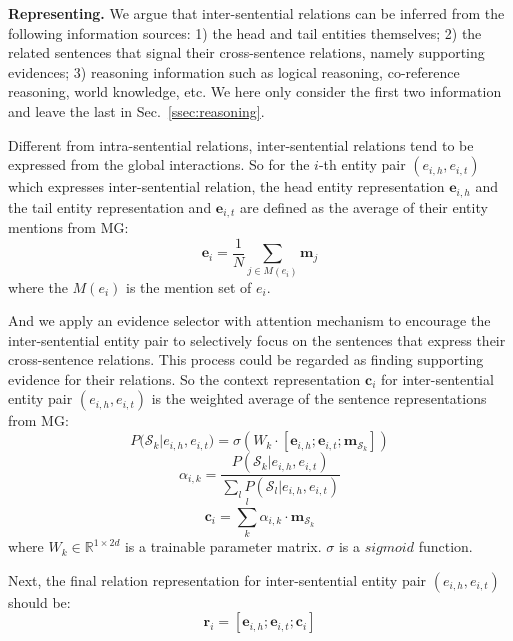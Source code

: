\documentclass[11pt,a4paper]{article}
\begin{document}
\noindent
\textbf{Representing.} We argue that inter-sentential relations can be inferred from the following information sources: 1) the head and tail entities themselves; 2) the related sentences that signal their cross-sentence relations, namely supporting evidences; 3) reasoning information such as logical reasoning, co-reference reasoning, world knowledge, etc. We here only consider the first two information and leave the last in Sec.~\ref{ssec:reasoning}.

Different from intra-sentential relations, inter-sentential relations tend to be expressed from the global interactions. So for the $i$-th entity pair $(e_{i,h}, e_{i,t})$ which expresses inter-sentential relation, the head entity representation $\textbf{e}_{i,h}$ and the tail entity representation and $\textbf{e}_{i,t}$ are defined as the average of their entity mentions from MG:
\begin{equation}
    \textbf{e}_{i} = \frac{1}{N} \sum_{j \in M(e_i)} \textbf{m}_j
    \label{equation:global-entity}
\end{equation}
where the $M(e_i)$ is the mention set of $e_i$.

And we apply an evidence selector with attention mechanism \citep{Attention} to encourage the inter-sentential entity pair to selectively focus on the sentences that express their cross-sentence relations. This process could be regarded as finding supporting evidence for their relations. So the context representation $\textbf{c}_{i}$ for inter-sentential entity pair $(e_{i,h}, e_{i,t})$ is the weighted average of the sentence representations from MG:
\begin{equation}
P({\mathcal{S}_{k}|e_{i,h},e_{i,t})} = \sigma (W_k \cdot [\textbf{e}_{i,h}; \textbf{e}_{i,t}; \textbf{m}_{\mathcal{S}_{k}}])
\label{equation:inter-context-logits}
\end{equation}
\begin{equation}
    \alpha_{i,k} = \frac{P(\mathcal{S}_{k}|e_{i,h},e_{i,t})}{\sum_{l}P(\mathcal{S}_{l}|e_{i,h},e_{i,t})}
    \label{equation:inter-context-percent}
\end{equation}
\begin{equation}
    \textbf{c}_{i} = \sum^{l}_{k}\alpha_{i,k} \cdot \textbf{m}_{\mathcal{S}_{k}}
\end{equation}
where $W_k\in \mathbb{R}^{1 \times 2d}$ is a trainable parameter matrix. $\sigma$ is a $sigmoid$ function. 


Next, the final relation representation for inter-sentential entity pair $(e_{i,h}, e_{i,t})$ should be:
\begin{equation}
\textbf{r}_{i} = [\textbf{e}_{i,h}; \textbf{e}_{i,t}; \textbf{c}_{i}]
\label{eq-14}
\end{equation}
\end{document}
